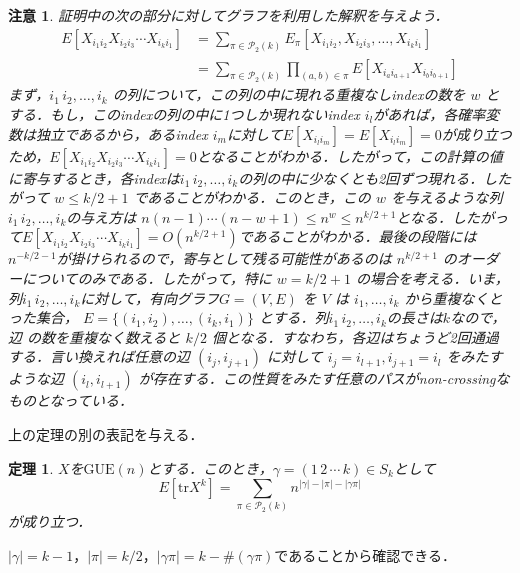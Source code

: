 \documentclass{ltjsarticle}
\makeatletter
\theoremstyle{mystyle1}
\newtheorem{thm}[dfn]{定理}
\theoremstyle{mystyle2}
\newtheorem{note*}{注意}
\theoremstyle{mystyle3}
\renewenvironment{proof}[1][\proofname]{\par
  \pushQED{\qed}%
  \normalfont
  \topsep6\p@\@plus6\p@ \trivlist
  \item[\hskip\labelsep{\bfseries\sffamily #1}]\ignorespaces
}{%
  \popQED\endtrivlist\@endpefalse
}
\renewcommand\proofname{証明}
\makeatother
\begin{document}
\begin{note*}
    証明中の次の部分に対してグラフを利用した解釈を与えよう．
    \begin{equation}
        \begin{split}
            E[X_{i_1i_2}X_{i_2i_3}\cdots X_{i_ki_1}]
            & =\sum_{\pi\in\mathcal{P}_2(k)}E_\pi[X_{i_1i_2},X_{i_2i_3},\ldots, X_{i_ki_1}]    \\
            & =\sum_{\pi\in\mathcal{P}_2(k)}\prod_{(a,b)\in\pi}E[X_{i_ai_{a+1}}X_{i_bi_{b+1}}]
        \end{split}
    \end{equation}
    まず，$i_1\,i_2,\ldots,i_k$ の列について，この列の中に現れる重複なしindexの数を $w$ とする．もし，このindexの列の中に1つしか現れないindex $i_l$があれば，各確率変数は独立であるから，あるindex $i_m$に対して$E[X_{i_li_m}]=E[X_{i_li_m}]=0$が成り立つため，$E[X_{i_1i_2}X_{i_2i_3}\cdots X_{i_ki_1}]=0$となることがわかる．したがって，この計算の値に寄与するとき，各indexは$i_1\,i_2,\ldots,i_k$の列の中に少なくとも2回ずつ現れる．したがって $w\leq k/2+1$ であることがわかる．このとき，この $w$ を与えるような列$i_1\,i_2,\ldots,i_k$の与え方は $n(n-1)\cdots(n-w+1)\leq n^w\leq n^{k/2+1}$となる．したがって$E[X_{i_1i_2}X_{i_2i_3}\cdots X_{i_ki_1}]=O(n^{k/2+1})$であることがわかる．最後の段階には$n^{-k/2-1}$が掛けられるので，寄与として残る可能性があるのは $n^{k/2+1}$ のオーダーについてのみである．したがって，特に $w=k/2+1$ の場合を考える．いま，列$i_1\,i_2,\ldots,i_k$に対して，有向グラフ$G=(V,E)$ を $V$ は $i_1,\ldots,i_k$ から重複なくとった集合， $E=\{(i_1,i_2),\ldots,(i_k,i_1)\}$ とする．列$i_1\,i_2,\ldots,i_k$の長さは$k$なので，辺 の数を重複なく数えると $k/2$ 個となる．すなわち，各辺はちょうど2回通過する．言い換えれば任意の辺 $(i_j,i_{j+1})$ に対して $i_j=i_{l+1},i_{j+1}=i_l$ をみたすような辺 $(i_l,i_{l+1})$ が存在する．この性質をみたす任意のパスがnon-crossingなものとなっている．
\end{note*}

上の定理の別の表記を与える．

\begin{thm}
    $X$を$\mathrm{GUE}(n)$とする．このとき，$\gamma=(1\,2\,\cdots\,k)\in S_k$として
    \begin{equation}
        E[\mathrm{tr}X^k]=\sum_{\pi\in\mathcal{P}_2(k)}n^{|\gamma|-|\pi|-|\gamma\pi|}
    \end{equation}
    が成り立つ．
\end{thm}

\begin{proof}
    $|\gamma|=k-1$，$|\pi|=k/2$，$|\gamma\pi|=k-\#(\gamma\pi)$であることから確認できる．
\end{proof}
\end{document}
